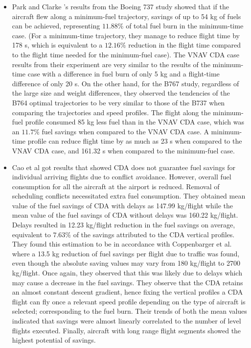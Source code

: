 \documentclass{aer1315-pretty}
\begin{document}
\begin{itemize}

\item Park and Clarke \cite{Park:2015} 's results from the Boeing 737 study showed that if the aircraft flew along a minimum-fuel trajectory, savings of up to 54 kg of fuels can be achieved, representing $11.88\%$ of total fuel burn in the minimum-time case. (For a minimum-time trajectory, they manage to reduce flight time by 178 s, which is equivalent to a $12.16\%$ reduction in the flight time compared to the flight time needed for the minimum-fuel case). The VNAV CDA case results from their experiment are very similar to the results of the minimum-time case with a difference in fuel burn of only 5 kg and a flight-time difference of only 20 s. On the other hand, for the B767 study, regardless of the large size and weight differences, they observed the tendencies of the B764 optimal trajectories to be very similar to those of the B737 when comparing the trajectories and speed profiles. The flight along the minimum-fuel profile consumed 85 kg less fuel than in the VNAV CDA case, which was an $11.7\%$ fuel savings when compared to the VNAV CDA case. A minimum-time profile can reduce flight time by as much as 23 s when compared to the VNAV CDA case, and 161.32 s when compared to the minimum-fuel case.



\item Cao et al \cite{Cao:2013} got results that showed CDA does not guarantee fuel savings for individual arriving flights due to conflict avoidance. However, overall fuel consumption for all the aircraft at the airport is reduced. Removal of scheduling conflicts necessitated extra fuel consumption. They obtained mean value of the fuel savings of CDA with delays as 147.99 kg/flight while the mean value of the fuel savings of CDA without delays was 160.22 kg/flight. Delays resulted in  12.23 kg/flight reduction in the fuel savings on average, equivalent to $7.63\%$ of the savings attributed to the CDA vertical profiles. They found this estimation to be in accordance with Coppenbarger et al.\cite{Copp:2010b} where a 13.5 kg reduction of fuel savings per flight due to traffic was found, even though the absolute saving values may vary from 180 kg/flight to 2700 kg/flight. Once again, they observed that this was likely due to delays which may cause a decrease in the fuel savings. They observe that the CDA retains an almost constant descent gradient, hence fixing the vertical profiles a CDA flight can fly once a relevant speed profile depending on the type of aircraft 
is selected; corresponding to the fuel burn. Their trends of both the mean values indicated that savings were almost linearly correlated to the number of level flights executed. Finally, aircraft with long range flight segments showed the highest potential of savings. 



\end{itemize}
\end{document}
